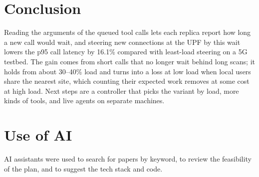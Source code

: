 \documentclass{article}
\newcommand{\mybibstyle}{iclr2027_conference}
\newcommand{\mybibstyle}{plainnat}
\begin{document}
\section{Conclusion}
Reading the arguments of the queued tool calls lets each replica report how long a new
call would wait, and steering new connections at the UPF by this wait lowers the p95 call
latency by 16.1\% compared with least-load steering on a 5G testbed. The gain comes from
short calls that no longer wait behind long scans; it holds from about 30--40\% load and
turns into a loss at low load when local users share the nearest site, which counting
their expected work removes at some cost at high load. Next steps are a controller that
picks the variant by load, more kinds of tools, and live agents on separate machines.

\section*{Use of AI}
AI assistants were used to search for papers by keyword, to review the feasibility of the
plan, and to suggest the tech stack and code.



\end{document}
